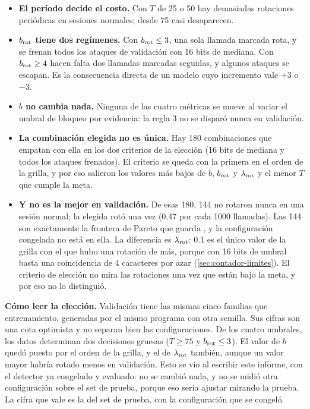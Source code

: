 \begin{itemize}
  \item \textbf{El período decide el costo.} Con $T$ de 25 o 50 hay demasiadas rotaciones periódicas
    en sesiones normales; desde 75 casi desaparecen.
  \item \textbf{$b_{\mathrm{rot}}$ tiene dos regímenes.} Con $b_{\mathrm{rot}} \leq 3$, una sola llamada marcada rota, y se
    frenan todos los ataques de validación con 16 bits de mediana. Con $b_{\mathrm{rot}} \geq 4$ hacen falta dos
    llamadas marcadas seguidas, y algunos ataques se escapan. Es la consecuencia directa de un modelo
    cuyo incremento vale $+3$ o $-3$.
  \item \textbf{$b$ no cambia nada.} Ninguna de las cuatro métricas se mueve al variar el umbral de
    bloqueo por evidencia: la regla 3 no se disparó nunca en validación.
  \item \textbf{La combinación elegida no es única.} Hay 180 combinaciones que empatan con ella en
    los dos criterios de la elección (16 bits de mediana y todos los ataques frenados). El criterio se
    queda con la primera en el orden de la grilla, y por eso salieron los valores más bajos de $b$,
    $b_{\mathrm{rot}}$ y $\lambda_{\mathrm{rot}}$ y el menor $T$ que cumple la meta.
  \item \textbf{Y no es la mejor en validación.} De esas 180, 144 no rotaron nunca en una sesión
    normal; la elegida rotó una vez (0,47 por cada \num{1000} llamadas). Las 144 son exactamente la
    frontera de Pareto que guarda , y la configuración congelada no
    está en ella. La diferencia es $\lambda_{\mathrm{rot}}$: \num{0.1} es el único valor de la grilla con el que hubo
    una rotación de más, porque con 16 bits de umbral basta una coincidencia de 4 caracteres por azar
    (\cref{sec:contador-limites}). El criterio de elección no mira las rotaciones una vez que están
    bajo la meta, y por eso no lo distinguió.
\end{itemize}

\begin{limite}
\textbf{Cómo leer la elección.} Validación tiene las mismas cinco familias que entrenamiento,
generadas por el mismo programa con otra semilla. Sus cifras son una cota optimista y no separan
bien las configuraciones. De los cuatro umbrales, los datos determinan dos decisiones gruesas
($T \geq 75$ y $b_{\mathrm{rot}} \leq 3$). El valor de $b$ quedó puesto por el orden de la grilla, y el de
$\lambda_{\mathrm{rot}}$ también, aunque un valor mayor habría rotado menos en validación. Esto se vio al escribir
este informe, con el detector ya congelado y evaluado: no se cambió nada, y no se midió otra
configuración sobre el set de prueba, porque eso sería ajustar mirando la prueba. La cifra que vale
es la del set de prueba, con la configuración que se congeló.
\end{limite}

